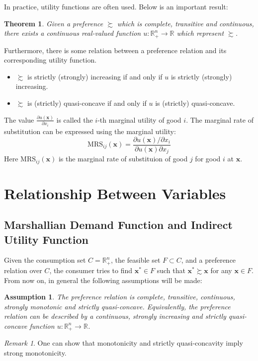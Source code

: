 \documentclass[openany]{book}
\newtheorem{theorem}{Theorem}[chapter]
\newtheorem{assumption}{Assumption}[chapter]
\theoremstyle{remark}
\newtheorem*{remark}{Remark}
\begin{document}
In practice, utility functions are often used. Below is an important result:
\begin{theorem}
    Given a preference $\succsim$ which is complete, transitive and continuous, there exists a continuous real-valued function $u: \mathbb{R}_+^n\to \mathbb{R}$ which represent $\succsim$.
\end{theorem}
Furthermore, there is some relation between a preference relation and its corresponding utility function.
\begin{itemize}
    \item $\succsim$ is strictly (strongly) increasing if and only if $u$ is strictly (strongly) increasing.
    \item $\succsim$ is (strictly) quasi-concave if and only if $u$ is (strictly) quasi-concave.
\end{itemize}
The value $\frac{\partial u(\boldsymbol{x})}{\partial x_i}$ is called the $i$-th marginal utility of good $i$. The marginal rate of substitution can be expressed using the marginal utility:
\begin{equation}
    \mathrm{MRS}_{ij}(\boldsymbol{x})=\frac{\partial u(\boldsymbol{x})/\partial x_i}{\partial u(\boldsymbol{x})\partial x_j}
\end{equation}
Here $\mathrm{MRS}_{ij}(\boldsymbol{x})$ is the marginal rate of substituion of good $j$ for good $i$ at $\boldsymbol{x}$.

\section{Relationship Between Variables}
\subsection{Marshallian Demand Function and Indirect Utility Function}
Given the consumption set $C=\mathbb{R}_+^n$, the feasible set $F\subset C$, and a preference relation over $C$, the consumer tries to find $\boldsymbol{x}^*\in F$ such that $\boldsymbol{x}^*\succsim \boldsymbol{x}$ for any $\boldsymbol{x}\in F$. From now on, in general the following assumptions will be made:
\begin{assumption}\label{goodPreference}
    The preference relation is complete, transitive, continuous, strongly monotonic and strictly quasi-concave. Equivalently, the preference relation can be described by a continuous, strongly increasing and strictly quasi-concave function $u:\mathbb{R}_+^n\to \mathbb{R}$.
\end{assumption}
\begin{remark}
    One can show that monotonicity and strictly quasi-concavity imply strong monotonicity.
\end{remark}
\end{document}
